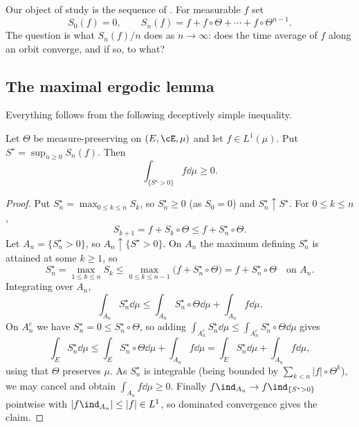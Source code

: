 \begin{center}
\end{center}

Our object of study is the sequence of . For measurable $f$ set
$$
S_0(f)=0, \qquad S_n(f) = f + f\circ\Theta + \cdots+f\circ\Theta^{n-1}.
$$
The question is what $S_n(f)/n$ does as $n \to \infty$: does the time average of $f$ along an orbit converge, and if so, to what?

\subsection{The maximal ergodic lemma}

Everything follows from the following deceptively simple inequality.

\begin{lemma}\label{pm-lem:maximal}
	Let $\Theta$ be measure-preserving on $(E,\cE,\mu)$ and let $f \in L^1(\mu)$. Put $S^\star = \sup_{n\geq0}S_n(f)$. Then
	$$
	\int_{\{S^\star>0\}} f \dd\mu \geq 0.
	$$
\end{lemma}
\begin{proof}
	Put $S_n^\star = \max_{0\leq k\leq n}S_k$, so $S_n^\star \geq 0$ (as $S_0 = 0$) and $S_n^\star \uparrow S^\star$. For $0 \leq k \leq n$,
	$$
	S_{k+1} = f + S_k \circ\Theta \leq f + S_n^\star\circ\Theta.
	$$
	Let $A_n = \{S_n^\star>0\}$, so $A_n \uparrow \{S^\star>0\}$. On $A_n$ the maximum defining $S_n^\star$ is attained at some $k \geq 1$, so
	$$
	S_n^\star = \max_{1\leq k \leq n}S_k \leq \max_{0\leq k\leq n-1}\big(f + S_n^\star\circ\Theta\big) = f + S_n^\star\circ\Theta \quad \text{on } A_n.
	$$
	Integrating over $A_n$,
	$$
	\int_{A_n}S_n^\star\dd\mu \leq \int_{A_n}S_n^\star\circ\Theta\dd\mu + \int_{A_n}f\dd\mu.
	$$
	On $A_n^c$ we have $S_n^\star=0\leq S_n^\star\circ\Theta$, so adding $\int_{A_n^c}S_n^\star\dd\mu \leq \int_{A_n^c}S_n^\star\circ\Theta\dd\mu$ gives
	$$
	\int_E S_n^\star\dd\mu \leq \int_E S_n^\star\circ\Theta\dd\mu+\int_{A_n}f\dd\mu = \int_E S_n^\star\dd\mu + \int_{A_n}f\dd\mu,
	$$
	using that $\Theta$ preserves $\mu$. As $S_n^\star$ is integrable (being bounded by $\sum_{k<n}|f|\circ\Theta^k$), we may cancel and obtain $\int_{A_n}f\dd\mu \geq 0$. Finally $f\ind_{A_n}\to f\ind_{\{S^\star>0\}}$ pointwise with $|f\ind_{A_n}|\leq|f| \in L^1$, so dominated convergence gives the claim.
\end{proof}

